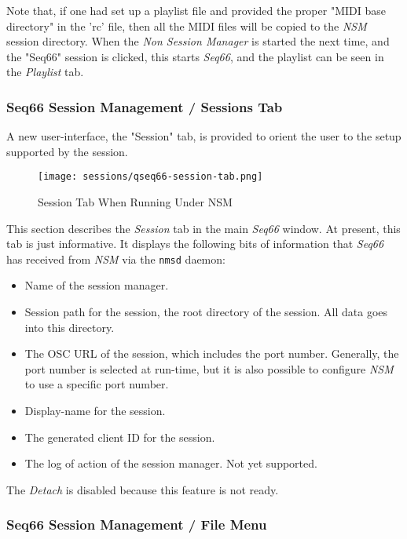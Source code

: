    Note that, if one had set up a playlist file and provided the proper "MIDI
   base directory" in the 'rc' file, then all the MIDI files will be copied to
   the \textsl{NSM} session directory.
   When the \textsl{Non Session Manager} is started the next time, and the
   "Seq66" session is clicked, this starts \textsl{Seq66}, and the playlist can
   be seen in the \textsl{Playlist} tab.

\subsubsection{Seq66 Session Management / Sessions Tab}
\label{subsubsec:sessions_ui}

   A new user-interface, the "Session" tab, is provided to orient the user to
   the setup supported by the session.

\begin{figure}[H]
   \centering 
   \texttt{[image: sessions/qseq66-session-tab.png]}
   \caption*{Session Tab When Running Under NSM}
\end{figure}

   This section describes the \textsl{Session} tab in the main
   \textsl{Seq66} window.  At present, this tab is just informative.  It
   displays the following bits of information that \textsl{Seq66} has received
   from \textsl{NSM} via the \texttt{nmsd} daemon:

   \begin{itemize}
      \item Name of the session manager.
      \item Session path for the session, the root directory of the session.
         All data goes into this directory.
      \item The OSC URL of the session, which includes the port number.
         Generally, the port number is selected at run-time, but it is also
         possible to configure \textsl{NSM} to use a specific port number.
      \item Display-name for the session.
      \item The generated client ID for the session.
      \item The log of action of the session manager. Not yet supported.
   \end{itemize}

   The \textsl{Detach} is disabled because this feature is not ready.

\subsubsection{Seq66 Session Management / File Menu}
\label{subsubsec:sessions_file_menu}

